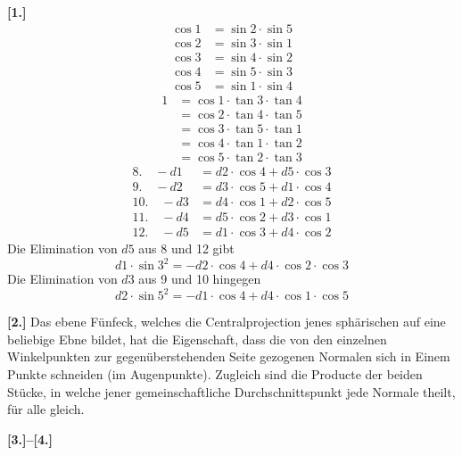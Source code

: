 \documentclass[10pt,a4paper]{article}
\begin{document}
\textbf{[1.]}
%
\begin{align*}
\cos 1 &= \sin 2 \cdot \sin 5 \\
\cos 2 &= \sin 3 \cdot \sin 1 \\
\cos 3 &= \sin 4 \cdot \sin 2 \\
\cos 4 &= \sin 5 \cdot \sin 3 \\
\cos 5 &= \sin 1 \cdot \sin 4
\end{align*}
%
\begin{align*}
1 &= \cos 1 \cdot \tan 3 \cdot \tan 4 \\
&= \cos 2 \cdot \tan 4 \cdot \tan 5 \\
&= \cos 3 \cdot \tan 5 \cdot \tan 1 \\
&= \cos 4 \cdot \tan 1 \cdot \tan 2 \\
&= \cos 5 \cdot \tan 2 \cdot \tan 3
\end{align*}
%
\begin{align*}
8.\quad -d1 &= d2 \cdot \cos 4 + d5 \cdot \cos 3 \\
9.\quad -d2 &= d3 \cdot \cos 5 + d1 \cdot \cos 4 \\
10.\quad -d3 &= d4 \cdot \cos 1 + d2 \cdot \cos 5 \\
11.\quad -d4 &= d5 \cdot \cos 2 + d3 \cdot \cos 1 \\
12.\quad -d5 &= d1 \cdot \cos 3 + d4 \cdot \cos 2
\end{align*}
%
Die Elimination von $d5$ aus 8 und 12 gibt
%
\begin{equation*}
d1 \cdot \sin 3^2 = -d2 \cdot \cos 4 + d4 \cdot \cos 2 \cdot \cos 3
\end{equation*}
%
Die Elimination von $d3$ aus 9 und 10 hingegen
%
\begin{equation*}
d2 \cdot \sin 5^2 = -d1 \cdot \cos 4 + d4 \cdot \cos 1 \cdot \cos 5
\end{equation*}

\textbf{[2.]} Das ebene F\"unfeck, welches die Centralprojection jenes sph\"arischen auf eine beliebige Ebne bildet, hat die Eigenschaft, dass die von den einzelnen Winkelpunkten zur gegen\"uberstehenden Seite gezogenen Normalen sich in Einem Punkte schneiden (im Augenpunkte). Zugleich sind die Producte der beiden St\"ucke, in welche jener gemeinschaftliche Durchschnittspunkt jede Normale theilt, f\"ur alle gleich.

\newpage
\textbf{[3.]--[4.]}
\end{document}
